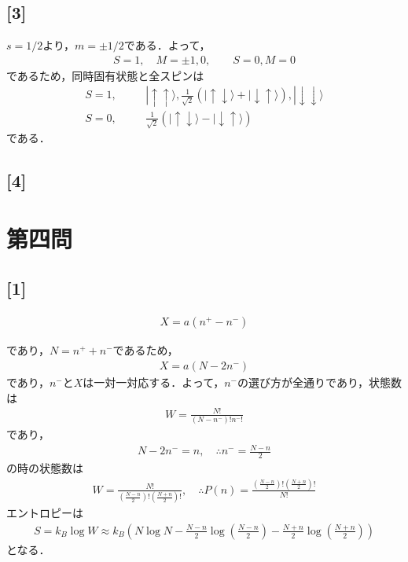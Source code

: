 \documentclass[12pt,dvipdfmx]{jsarticle}
\begin{document}
\subsection*{\large{[3]}}
$s=1/2$より，$m=\pm 1/2$である．よって，
\begin{eqnarray}
  S=1, \quad M = \pm 1, 0,\qquad S=0, M=0
\end{eqnarray}
であるため，同時固有状態と全スピンは
\begin{eqnarray}
  S=1, &&\quad |\uparrow\uparrow\rangle, \frac{1}{\sqrt{2}}\left( |\uparrow\downarrow\rangle+ |\downarrow\uparrow\rangle\right), |\downarrow\downarrow\rangle\\
  S=0, &&\quad  \frac{1}{\sqrt{2}}\left( |\uparrow\downarrow\rangle- |\downarrow\uparrow\rangle\right)
\end{eqnarray}
である．
\subsection*{\large{[4]}}

\newpage
\section*{\Large{第四問}}
\subsection*{\large{[1]}}

\begin{eqnarray}
  X = a\left( n^{+}-n^{-} \right)
\end{eqnarray}

であり，$N=n^{+}+n^{-}$であるため，
\begin{eqnarray}
  X = a\left( N-2n^{-} \right)
\end{eqnarray}
であり，$n^{-}$と$X$は一対一対応する．よって，$n^{-}$の選び方が全通りであり，状態数は
\begin{eqnarray}
  W = \frac{N!}{(N-n^{-})!n^{-}!}
\end{eqnarray}
であり，
\begin{eqnarray}
  N-2n^{-}=n, \quad\therefore n^{-}=\frac{N-n}{2}
\end{eqnarray}
の時の状態数は
\begin{eqnarray}
  W = \frac{N!}{(\frac{N-n}{2})!(\frac{N+n}{2})!},\quad\therefore P(n) = \frac{(\frac{N-n}{2})!(\frac{N+n}{2})!}{N!}
\end{eqnarray}
エントロピーは
\begin{eqnarray}
  S = k_B\log W \approx k_B\left( N\log N - \frac{N-n}{2}\log\left( \frac{N-n}{2}\right)-\frac{N+n}{2}\log\left( \frac{N+n}{2}\right) \right)
\end{eqnarray}
となる．
\end{document}
